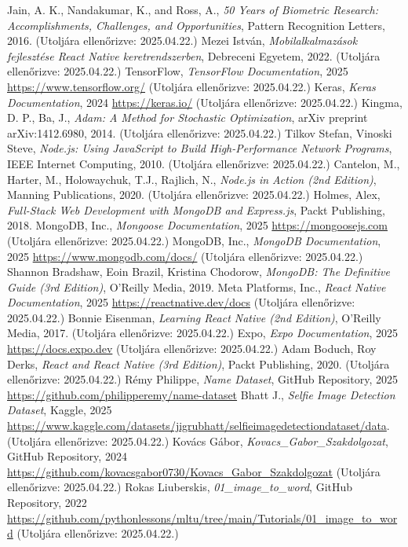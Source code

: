 \documentclass[
]{thesis-ekf}
\theoremstyle{definition}
\theoremstyle{remark}
\begin{document}
\begin{thebibliography}{2}
	 Jain, A. K., Nandakumar, K., and Ross, A., \textit{50 Years of Biometric Research: Accomplishments, Challenges, and Opportunities}, Pattern Recognition Letters, 2016. (Utoljára ellenőrizve: 2025.04.22.)
	 Mezei István, \textit{Mobilalkalmazások fejlesztése React Native keretrendszerben}, Debreceni Egyetem, 2022. (Utoljára ellenőrizve: 2025.04.22.)
	 TensorFlow, \textit{TensorFlow Documentation}, 2025 \url{https://www.tensorflow.org/} (Utoljára ellenőrizve: 2025.04.22.)
	 Keras, \textit{Keras Documentation}, 2024 \url{https://keras.io/} (Utoljára ellenőrizve: 2025.04.22.)
	 Kingma, D. P., Ba, J., \textit{Adam: A Method for Stochastic Optimization}, arXiv preprint arXiv:1412.6980, 2014. (Utoljára ellenőrizve: 2025.04.22.)
	 Tilkov Stefan, Vinoski Steve, \textit{Node.js: Using JavaScript to Build High-Performance Network Programs}, IEEE Internet Computing, 2010. (Utoljára ellenőrizve: 2025.04.22.)
	 Cantelon, M., Harter, M., Holowaychuk, T.J., Rajlich, N., \textit{Node.js in Action (2nd Edition)}, Manning Publications, 2020. (Utoljára ellenőrizve: 2025.04.22.)
	 Holmes, Alex, \textit{Full-Stack Web Development with MongoDB and Express.js}, Packt Publishing, 2018.
	 MongoDB, Inc., \textit{Mongoose Documentation}, 2025 \url{https://mongoosejs.com} (Utoljára ellenőrizve: 2025.04.22.)
	 MongoDB, Inc., \textit{MongoDB Documentation}, 2025 \url{https://www.mongodb.com/docs/} (Utoljára ellenőrizve: 2025.04.22.)
	 Shannon Bradshaw, Eoin Brazil, Kristina Chodorow, \textit{MongoDB: The Definitive Guide (3rd Edition)}, O'Reilly Media, 2019.
	 Meta Platforms, Inc., \textit{React Native Documentation}, 2025 \url{https://reactnative.dev/docs} (Utoljára ellenőrizve: 2025.04.22.)
	 Bonnie Eisenman, \textit{Learning React Native (2nd Edition)}, O'Reilly Media, 2017. (Utoljára ellenőrizve: 2025.04.22.)
	 Expo, \textit{Expo Documentation}, 2025 \url{https://docs.expo.dev} (Utoljára ellenőrizve: 2025.04.22.)
	 Adam Boduch, Roy Derks, \textit{React and React Native (3rd Edition)}, Packt Publishing, 2020. (Utoljára ellenőrizve: 2025.04.22.)
	 Rémy Philippe, \textit{Name Dataset}, GitHub Repository, 2025 \url{https://github.com/philipperemy/name-dataset}
	 Bhatt J., \textit{Selfie Image Detection Dataset}, Kaggle, 2025 \url{https://www.kaggle.com/datasets/jigrubhatt/selfieimagedetectiondataset/data}. (Utoljára ellenőrizve: 2025.04.22.)
	 Kovács Gábor, \textit{Kovacs\_Gabor\_Szakdolgozat}, GitHub Repository, 2024 \url{https://github.com/kovacsgabor0730/Kovacs_Gabor_Szakdolgozat} (Utoljára ellenőrizve: 2025.04.22.)
	 Rokas Liuberskis, \textit{01\_image\_to\_word}, GitHub Repository, 2022 \url{https://github.com/pythonlessons/mltu/tree/main/Tutorials/01_image_to_word} (Utoljára ellenőrizve: 2025.04.22.)
\end{thebibliography}

\end{document}
